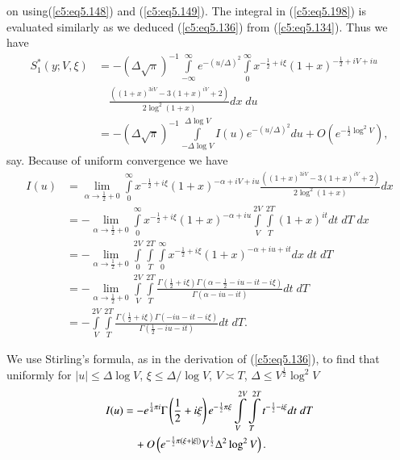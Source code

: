 on using\pageoriginale (\ref{c5:eq5.148}) and (\ref{c5:eq5.149}). The
integral in (\ref{c5:eq5.198}) is evaluated similarly as we deduced
(\ref{c5:eq5.136}) from (\ref{c5:eq5.134}). Thus we have 
\begin{align*}
 S^*_1 (y;V,\xi) & = 
-(\Delta \sqrt{\pi})^{-1} \int\limits^{\infty}_{-\infty}
e^{-(u/\Delta)^2} \int\limits^\infty_0 x^{-\frac{1}{2} + i  \xi}
(1+x)^{-\frac{1}{2} + iV + iu }\\ 
&\quad  \frac{\left((1+x)^{3iV} - 3 (1+x)^{iV} + 2\right)}
{2 \log^2 (1+x)} dx \; du\\
& = -(\Delta\sqrt{\pi})^{-1} \int\limits^{\Delta \log V}_{-\Delta \log
  V} I (u) e^{-(u/\Delta)^2} du + O \left(e^{-\frac{1}{2} \log^2
  V}\right),  
\end{align*}
say. Because of uniform convergence we have
\begin{align*}
I(u) & = \lim\limits_{\alpha \to \frac{1}{2} + 0} \int\limits^\infty_0
x^{-\frac{1}{2} + i \xi} (1+x)^{-\alpha + iV + iu} \frac{\left((1+x)^{3iV}
  - 3 (1+x)^{iV} +2\right)}{2 \log^2 (1+x)}dx\\ 
& = -\lim\limits_{\alpha \to \frac{1}{2} + 0} \int\limits^\infty_0
x^{-\frac{1}{2} + i \xi} (1+x)^{-\alpha + iu} \int\limits^{2V}_V
\int\limits^{2T}_T (1+x)^{it} dt \; dT \; dx\\ 
& = - \lim\limits_{\alpha \to \frac{1}{2} + 0} \int\limits^{2V}_0
\int\limits^{2T}_T \int\limits^\infty_0 x^{-\frac{1}{2} + i \xi}
(1+x)^{-\alpha + iu + it} dx \; dt \; dT\\ 
& = -\lim\limits_{\alpha \to \frac{1}{2} +0} \int\limits^{2V}_V
\int\limits^{2T}_T \frac{\Gamma \left(\frac{1}{2} + i \xi\right)
  \Gamma \left(\alpha - 
  \frac{1}{2} - i u - it - i \xi\right)}{ \Gamma (\alpha -  i u - it)}
dt \; dT\\ 
& = - \int\limits^{2V}_V \int\limits^{2T}_T
\frac{\Gamma\left(\frac{1}{2} + i \xi\right)\Gamma (-iu - it - i
  \xi)}{\Gamma \left(\frac{1}{2}  - iu - it\right)} dt \; dT.  
\end{align*}

We use Stirling's formula, as in the derivation of (\ref{c5:eq5.136}),
to find that uniformly for $|u| \leq \Delta \log V$, $\xi \leq
\Delta/\log V$, $V \asymp T$, $\Delta \leq V^{\frac{1}{2}} \log^2 V$ 
\begin{align}
I(u) &= - e^{\frac{1}{4} \pi i} \Gamma \left(\frac{1}{2} + i \xi
\right) e^{-\frac{1}{2} \pi \xi} \int\limits^{2V}_V \int\limits^{2T}_T
t^{-\frac{1}{2} - i \xi} dt \; dT\notag\\
&\quad +  O \left(e^{-\frac{1}{2} \pi (\xi + |\xi|)} V^{\frac{1}{2}}
\Delta^2 \log^2 V \right). \label{c5:eq5.199} 
\end{align}

